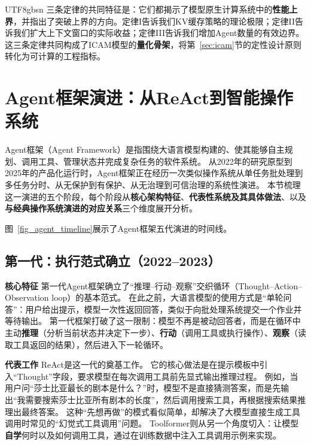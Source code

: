 \documentclass[11pt,a4paper]{article}
\begin{document}
\begin{CJK*}{UTF8}{gbsn}
三条定律的共同特征是：它们都揭示了模型原生计算系统中的\textbf{性能上界}，并指出了突破上界的方向。定律I告诉我们KV缓存策略的理论极限；定律II告诉我们扩大上下文窗口的实际收益；定律III告诉我们增加Agent数量的有效边界。这三条定律共同构成了ICAM模型的\textbf{量化骨架}，将第~\ref{sec:icam}节的定性设计原则转化为可计算的工程指标。
\section{Agent框架演进：从ReAct到智能操作系统}
\label{sec:agentevolution}

Agent框架（Agent Framework）是指围绕大语言模型构建的、使其能够自主规划、调用工具、管理状态并完成复杂任务的软件系统。
从2022年的研究原型到2025年的产品化运行时，Agent框架正在经历一次类似操作系统从单任务批处理到多任务分时、从无保护到有保护、从无治理到可信治理的系统性演进。
本节梳理这一演进的五个阶段，每个阶段从\textbf{核心架构特征}、\textbf{代表性系统及其具体做法}、以及\textbf{与经典操作系统演进的对应关系}三个维度展开分析。

图~\ref{fig_agent_timeline}展示了Agent框架五代演进的时间线。


\subsection*{第一代：执行范式确立（2022--2023）}

\textbf{核心特征}
第一代Agent框架确立了``推理--行动--观察''交织循环（Thought--Action--Observation loop）的基本范式。
在此之前，大语言模型的使用方式是``单轮问答''：用户给出提示，模型一次性返回回答，类似于向批处理系统提交一个作业并等待输出。
第一代框架打破了这一限制：模型不再是被动回答者，而是在循环中主动\textbf{推理}（分析当前状态并决定下一步）、\textbf{行动}（调用工具或执行操作）、\textbf{观察}（读取工具返回的结果），然后进入下一轮循环。

\textbf{代表工作}
ReAct\cite{yao2023react}是这一代的奠基工作。
它的核心做法是在提示模板中引入``Thought''字段，要求模型在每次调用工具前先显式输出推理过程。
例如，当用户问``莎士比亚最长的剧本是什么？''时，模型不是直接猜测答案，而是先输出``我需要搜索莎士比亚所有剧本的长度''，然后调用搜索工具，再根据搜索结果推理出最终答案。
这种``先想再做''的模式看似简单，却解决了大模型直接生成工具调用时常见的``幻觉式工具调用''问题。
Toolformer\cite{schick2023toolformer}则从另一个角度切入：让模型\textbf{自学}何时以及如何调用工具，通过在训练数据中注入工具调用示例来实现。


\end{CJK*}
\end{document}

